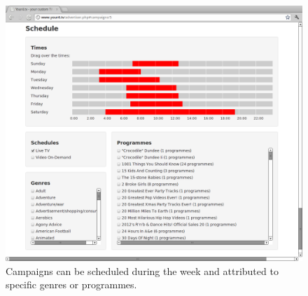 \begin{figure}[th]
	\centering
	\includegraphics[width=\textwidth,height=0.5\textheight,keepaspectratio]{images/screenshots/advertiser-campaign-schedule.png}
	\caption{Campaigns can be scheduled during the week and attributed to specific genres or programmes.}
	\label{fig:advertiser-campaign-schedule}
\end{figure}
